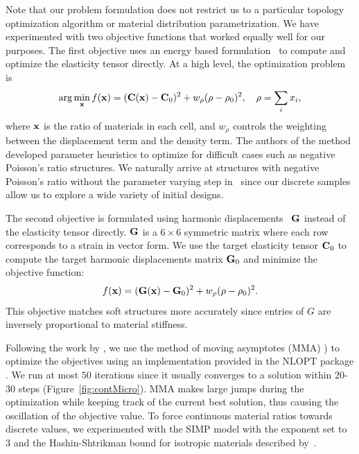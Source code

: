 Note that our problem formulation does not restrict us to a particular topology optimization algorithm or material distribution parametrization. We have experimented with two objective functions that worked equally well for our purposes.
The first objective uses an energy based formulation~\cite{xia:2015:design} to compute and optimize the elasticity tensor directly. At a high level, the optimization problem is
\begin{equation}
\arg\min_{\mathbf{x}} f(\mathbf{x}) = (\mathbf{C}(\mathbf{x})-\mathbf{C}_0)^2 + w_{\rho}(\rho-\rho_0)^2, \quad \rho = \sum_{i} x_{i} ,
\end{equation}
where $\mathbf{x}$ is the ratio of materials in each cell, and $w_{\rho}$ controls the weighting between the displacement term and the density term.
The authors of the method developed parameter heuristics to optimize for difficult cases such as negative Poisson's ratio structures. We naturally arrive at structures with negative Poisson's ratio without the parameter varying step in~\cite{xia:2015:design} since our discrete samples allow us to explore a wide variety of initial designs.

The second objective is formulated using harmonic displacements~\citep{Kharevych2009,Schumacher:2015} $\mathbf{G}$ instead of the elasticity tensor directly. $\mathbf{G}$ is a $6\times 6$ symmetric matrix where each row corresponds to a strain in vector form. We use the target elasticity tensor $\mathbf{C}_0$ to compute the target harmonic displacements matrix $\mathbf{G}_0$ and minimize the objective function:
\begin{equation}
f(\mathbf{x}) = (\mathbf{G}(\mathbf{x})-\mathbf{G}_0)^2 + w_{\rho}(\rho-\rho_0)^2.
\end{equation}
This objective matches soft structures more accurately since entries of $G$ are inversely proportional to material stiffness.

Following the work by \citet{Andreassen2014}, we use the method of moving asymptotes (MMA) \cite{svanberg1987method}) to optimize the objectives using an implementation provided in the NLOPT package \citep{johnson2014nlopt}. We run at most $50$ iterations since it usually converges to a solution within 20-30 steps (Figure~\ref{fig:contMicro}).
MMA makes large jumps during the optimization while keeping track of the current best solution, thus causing the oscillation of the objective value.
To force continuous material ratios towards discrete values, we experimented with the SIMP model with the exponent set to $3$ and the Hashin-Shtrikman bound for isotropic materials
described by~\citet{bendsoe1999material}.


